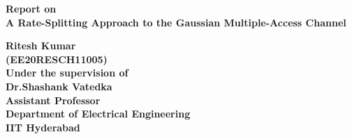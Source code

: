 \documentclass{article}
\begin{document}
	
	\begin{titlepage}
		\begin{center}
			\vspace*{1cm}
			
			\textbf{ \huge{ Report on\\\vspace{10pt} A Rate-Splitting Approach to the Gaussian Multiple-Access Channel}}
			\vspace{1.5cm}
			
			\textbf{Ritesh Kumar} \\
			\textbf{(EE20RESCH11005)}\\			
			\vspace{0.5cm}
			\textbf{Under the supervision of }\\
			\vspace{0.5cm}
			\textbf{Dr.Shashank Vatedka}\\
			\textbf{Assistant Professor}\\
			\textbf{ Department of Electrical Engineering}\\
			\textbf{IIT Hyderabad }
			\vfill			
		\end{center}
	\end{titlepage}
	\cleardoublepage
\end{document}

